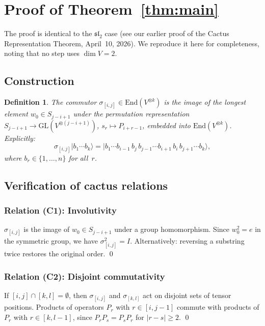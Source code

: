\documentclass[11pt]{article}
\newtheorem{definition}[theorem]{Definition}
\theoremstyle{remark}
\newcommand{\ket}[1]{|#1\rangle}
\begin{document}
\section{Proof of Theorem~\ref{thm:main}}

The proof is identical to the $\mathfrak{sl}_2$ case (see our earlier
proof of the Cactus Representation Theorem, April~10, 2026). We reproduce
it here for completeness, noting that no step uses $\dim V = 2$.

\subsection{Construction}

\begin{definition}
The commutor $\sigma_{[i,j]} \in \mathrm{End}(V^{\otimes k})$ is the
image of the longest element $w_0 \in S_{j-i+1}$ under the permutation
representation $S_{j-i+1} \to \mathrm{GL}(V^{\otimes(j-i+1)})$,
$s_r \mapsto P_{i+r-1}$, embedded into $\mathrm{End}(V^{\otimes k})$.
Explicitly:
\[
  \sigma_{[i,j]}\ket{b_1 \cdots b_k}
  = \ket{b_1 \cdots b_{i-1}\, b_j\, b_{j-1} \cdots b_{i+1}\, b_i\, b_{j+1} \cdots b_k},
\]
where $b_r \in \{1, \ldots, n\}$ for all~$r$.
\end{definition}

\subsection{Verification of cactus relations}

\subsubsection*{Relation (C1): Involutivity}

$\sigma_{[i,j]}$ is the image of $w_0 \in S_{j-i+1}$ under a group
homomorphism. Since $w_0^2 = e$ in the symmetric group, we have
$\sigma_{[i,j]}^2 = I$. Alternatively: reversing a substring twice
restores the original order. \qed

\subsubsection*{Relation (C2): Disjoint commutativity}

If $[i,j] \cap [k,l] = \emptyset$, then $\sigma_{[i,j]}$ and
$\sigma_{[k,l]}$ act on disjoint sets of tensor positions. Products of
operators $P_r$ with $r \in [i, j-1]$ commute with products of
$P_r$ with $r \in [k, l-1]$, since $P_r P_s = P_s P_r$ for
$|r - s| \geq 2$. \qed
\end{document}
